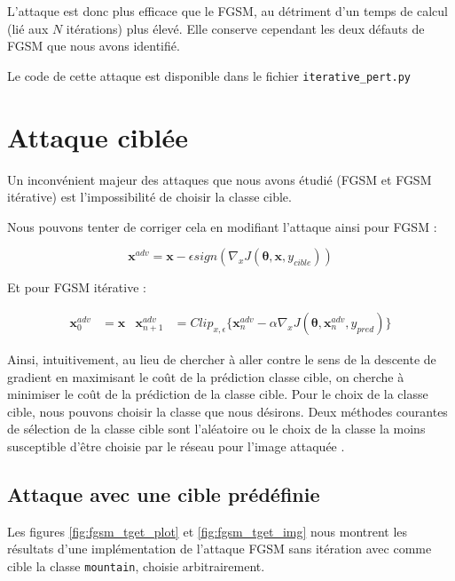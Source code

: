 \documentclass[10pt,twocolumn,letterpaper]{article}
\begin{document}
L'attaque est donc plus efficace que le FGSM, au détriment d'un temps de calcul (lié aux $N$ itérations) plus élevé. Elle conserve cependant les deux défauts de FGSM que nous avons identifié.

Le code de cette attaque est disponible dans le fichier \texttt{iterative\_pert.py}

\section{Attaque ciblée}

Un inconvénient majeur des attaques que nous avons étudié (FGSM et FGSM itérative) est l'impossibilité de choisir la classe cible.

Nous pouvons tenter de corriger cela en modifiant l'attaque ainsi pour FGSM :

\begin{equation}
\bm{x}^{adv} = \bm{x} - \epsilon sign(\nabla_x J(\bm{\theta}, \bm{x}, y_{cible}))
\end{equation}

Et pour FGSM itérative :

\begin{align}
\bm{x}^{adv}_0 &= \bm{x}  & \bm{x}^{adv}_{n+1} &= Clip_{x, \epsilon} \Big\{ \bm{x}^{adv}_n -\alpha \nabla_x J(\bm{\theta}, \bm{x}^{adv}_n, y_{pred}) \Big\}
\end{align}

Ainsi, intuitivement, au lieu de chercher à aller contre le sens de la descente de gradient en maximisant le coût de la prédiction classe cible, on cherche à minimiser le coût de la prédiction de la classe cible. Pour le choix de la classe cible, nous pouvons choisir la classe que nous désirons. Deux méthodes courantes de sélection de la classe cible sont l'aléatoire ou le choix de la classe la moins susceptible d'être choisie par le réseau pour l'image attaquée \cite{kurakin2016}.

\subsection{Attaque avec une cible prédéfinie}

Les figures \ref{fig:fgsm_tget_plot} et \ref{fig:fgsm_tget_img} nous montrent les résultats d'une implémentation de l'attaque FGSM sans itération avec comme cible la classe \texttt{mountain}, choisie arbitrairement.
\end{document}
